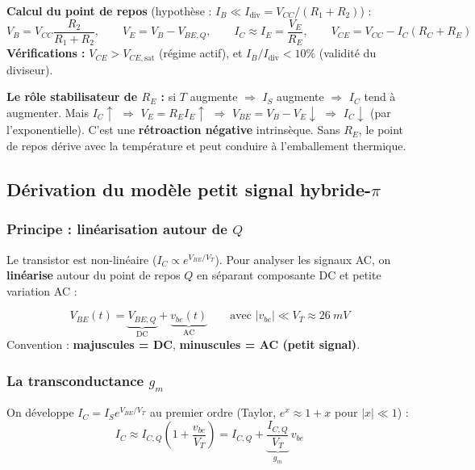 \documentclass[12pt,a4paper,twoside]{book}
\begin{document}
\begin{formule}
\textbf{Calcul du point de repos} (hypothèse : $I_B \ll I_{\text{div}} = V_{CC}/(R_1+R_2)$) :
\[
V_B = V_{CC}\frac{R_2}{R_1+R_2}, \qquad V_E = V_B - V_{BE,Q}, \qquad I_C \approx I_E = \frac{V_E}{R_E}, \qquad V_{CE} = V_{CC} - I_C(R_C+R_E)
\]
\textbf{Vérifications :} $V_{CE} > V_{CE,\text{sat}}$ (régime actif), et $I_B/I_{\text{div}} < 10\%$ (validité du diviseur).
\end{formule}

\begin{intuition}
\textbf{Le rôle stabilisateur de $R_E$ :} si $T$ augmente $\Rightarrow$ $I_S$ augmente $\Rightarrow$ $I_C$ tend à augmenter. Mais $I_C \uparrow$ $\Rightarrow$ $V_E = R_E I_E \uparrow$ $\Rightarrow$ $V_{BE} = V_B - V_E \downarrow$ $\Rightarrow$ $I_C \downarrow$ (par l'exponentielle). C'est une \textbf{rétroaction négative} intrinsèque. Sans $R_E$, le point de repos dérive avec la température et peut conduire à l'emballement thermique.
\end{intuition}

\subsection{Dérivation du modèle petit signal hybride-$\pi$}

\subsubsection*{Principe : linéarisation autour de $Q$}

Le transistor est non-linéaire ($I_C \propto e^{V_{BE}/V_T}$). Pour analyser les signaux AC, on \textbf{linéarise} autour du point de repos $Q$ en séparant composante DC et petite variation AC :

\begin{formule}
\[
V_{BE}(t) = \underbrace{V_{BE,Q}}_{\text{DC}} + \underbrace{v_{be}(t)}_{\text{AC}} \qquad \text{avec } |v_{be}| \ll V_T \approx \SI{26}{mV}
\]
Convention : \textbf{majuscules = DC}, \textbf{minuscules = AC (petit signal)}.
\end{formule}

\subsubsection*{La transconductance $g_m$}

On développe $I_C = I_S e^{V_{BE}/V_T}$ au premier ordre (Taylor, $e^x \approx 1+x$ pour $|x| \ll 1$) :
\[
I_C \approx I_{C,Q}\left(1 + \frac{v_{be}}{V_T}\right) = I_{C,Q} + \underbrace{\frac{I_{C,Q}}{V_T}}_{g_m}\,v_{be}
\]
\end{document}
